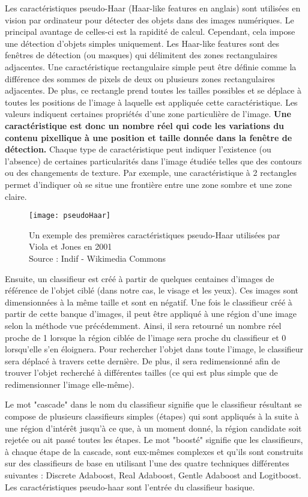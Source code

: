 Les caractéristiques pseudo-Haar (Haar-like features en anglais) sont utilisées en vision par ordinateur pour détecter des objets dans des images numériques. Le principal avantage de celles-ci est la rapidité de calcul. Cependant, cela impose une détection d’objets simples uniquement. Les Haar-like features sont des fenêtres de détection (ou masques) qui délimitent des zones rectangulaires adjacentes. Une caractéristique rectangulaire simple peut être définie comme la différence des sommes de pixels de deux ou plusieurs zones rectangulaires adjacentes. De plus, ce rectangle prend toutes les tailles possibles et se déplace à toutes les positions de l’image à laquelle est appliquée cette caractéristique. Les valeurs indiquent certaines propriétés d’une zone particulière de l’image. \textbf{Une caractéristique est donc un nombre réel qui code les variations du contenu pixellique à une position et taille donnée dans la fenêtre de détection.} Chaque type de caractéristique peut indiquer l’existence (ou l’absence) de certaines particularités dans l’image étudiée telles que des contours ou des changements de texture. Par exemple, une caractéristique à 2 rectangles permet d’indiquer où se situe une frontière entre une zone sombre et une zone claire.

\begin{figure}[H]
  \centering
  \texttt{[image: pseudoHaar]}
  \caption{Un exemple des premières caractéristiques pseudo-Haar utilisées par Viola et Jones en 2001 \\Source : Indif - Wikimedia Commons}
  \label{fig:pseudoHaar}
\end{figure}

Ensuite, un classifieur est créé à partir de quelques centaines d’images de référence de l’objet ciblé (dans notre cas, le visage et les yeux). Ces images sont dimensionnées à la même taille et sont en négatif. Une fois le classifieur créé à partir de cette banque d'images, il peut être appliqué à une région d’une image selon la méthode vue précédemment. Ainsi, il sera retourné un nombre réel proche de 1 lorsque la région ciblée de l’image sera proche du classifieur et 0 lorsqu’elle s’en éloignera. Pour rechercher l’objet dans toute l’image, le classifieur sera déplacé à travers cette dernière. De plus, il sera redimensionné afin de trouver l’objet recherché à différentes tailles (ce qui est plus simple que de redimensionner l’image elle-même). 

Le mot "cascade" dans le nom du classifieur signifie que le classifieur résultant se compose de plusieurs classifieurs simples (étapes) qui sont appliqués à la suite à une région d’intérêt jusqu’à ce que, à un moment donné, la région candidate soit rejetée ou ait passé toutes les étapes. Le mot "boosté" signifie que les classifieurs, à chaque étape de la cascade, sont eux-mêmes complexes et qu’ils sont construits sur des classifieurs de base en utilisant l'une des quatre techniques différentes suivantes : Discrete Adaboost, Real Adaboost, Gentle Adaboost and Logitboost. Les caractéristiques pseudo-haar sont l’entrée du classifieur basique.

